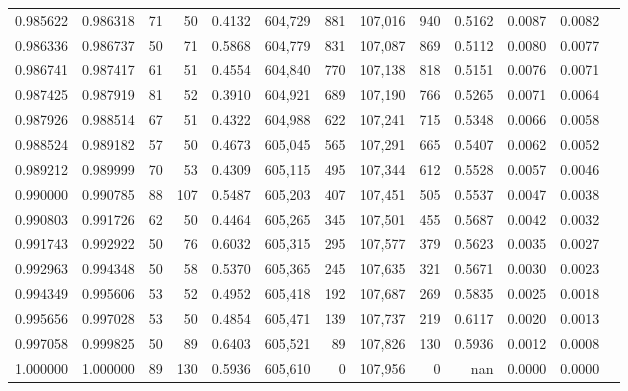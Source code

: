 \begin{tabular}{rrrrrrrrrrrrr}
0.985622 & 0.986318 &    71 &  50 &                                     0.4132 & 604,729 &     881 & 107,016 &     940 & 0.5162 & 0.0087 & 0.0082 \\
0.986336 & 0.986737 &    50 &  71 &                                     0.5868 & 604,779 &     831 & 107,087 &     869 & 0.5112 & 0.0080 & 0.0077 \\
0.986741 & 0.987417 &    61 &  51 &                                     0.4554 & 604,840 &     770 & 107,138 &     818 & 0.5151 & 0.0076 & 0.0071 \\
0.987425 & 0.987919 &    81 &  52 &                                     0.3910 & 604,921 &     689 & 107,190 &     766 & 0.5265 & 0.0071 & 0.0064 \\
0.987926 & 0.988514 &    67 &  51 &                                     0.4322 & 604,988 &     622 & 107,241 &     715 & 0.5348 & 0.0066 & 0.0058 \\
0.988524 & 0.989182 &    57 &  50 &                                     0.4673 & 605,045 &     565 & 107,291 &     665 & 0.5407 & 0.0062 & 0.0052 \\
0.989212 & 0.989999 &    70 &  53 &                                     0.4309 & 605,115 &     495 & 107,344 &     612 & 0.5528 & 0.0057 & 0.0046 \\
0.990000 & 0.990785 &    88 & 107 &                                     0.5487 & 605,203 &     407 & 107,451 &     505 & 0.5537 & 0.0047 & 0.0038 \\
0.990803 & 0.991726 &    62 &  50 &                                     0.4464 & 605,265 &     345 & 107,501 &     455 & 0.5687 & 0.0042 & 0.0032 \\
0.991743 & 0.992922 &    50 &  76 &                                     0.6032 & 605,315 &     295 & 107,577 &     379 & 0.5623 & 0.0035 & 0.0027 \\
0.992963 & 0.994348 &    50 &  58 &                                     0.5370 & 605,365 &     245 & 107,635 &     321 & 0.5671 & 0.0030 & 0.0023 \\
0.994349 & 0.995606 &    53 &  52 &                                     0.4952 & 605,418 &     192 & 107,687 &     269 & 0.5835 & 0.0025 & 0.0018 \\
0.995656 & 0.997028 &    53 &  50 &                                     0.4854 & 605,471 &     139 & 107,737 &     219 & 0.6117 & 0.0020 & 0.0013 \\
0.997058 & 0.999825 &    50 &  89 &                                     0.6403 & 605,521 &      89 & 107,826 &     130 & 0.5936 & 0.0012 & 0.0008 \\
1.000000 & 1.000000 &    89 & 130 &                                     0.5936 & 605,610 &       0 & 107,956 &       0 &    nan & 0.0000 & 0.0000 \\
\bottomrule
\end{tabular}
